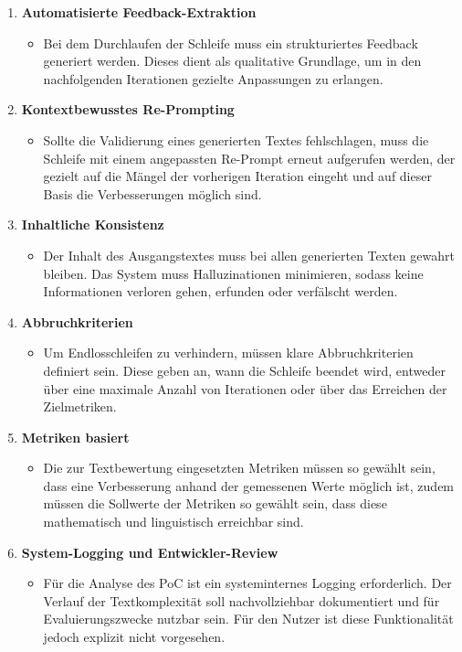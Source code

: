 \begin{enumerate}
	\item \textbf{Automatisierte Feedback-Extraktion}
	\begin{itemize}
		\item Bei dem Durchlaufen der Schleife muss ein strukturiertes Feedback generiert werden. Dieses dient als qualitative Grundlage, um in den nachfolgenden Iterationen gezielte Anpassungen zu erlangen.
	\end{itemize}
	\item \textbf{Kontextbewusstes Re-Prompting}
	\begin{itemize}
		\item Sollte die Validierung eines generierten Textes fehlschlagen, muss die Schleife mit einem angepassten Re-Prompt erneut aufgerufen werden, der gezielt auf die Mängel der vorherigen Iteration eingeht und auf dieser Basis die Verbesserungen möglich sind.
	\end{itemize}
	\item \textbf{Inhaltliche Konsistenz}
	\begin{itemize}
		\item Der Inhalt des Ausgangstextes muss bei allen generierten Texten gewahrt bleiben. Das System muss Halluzinationen minimieren, sodass keine Informationen verloren gehen, erfunden oder verfälscht werden.
	\end{itemize}
	\item \textbf{Abbruchkriterien}
	\begin{itemize}
		\item Um Endlosschleifen zu verhindern, müssen klare Abbruchkriterien definiert sein. Diese geben an, wann die Schleife beendet wird, entweder über eine maximale Anzahl von Iterationen oder über das Erreichen der Zielmetriken.
	\end{itemize}
	\item \textbf{Metriken basiert}
	\begin{itemize}
		\item Die zur Textbewertung eingesetzten Metriken müssen so gewählt sein, dass eine Verbesserung anhand der gemessenen Werte möglich ist, zudem müssen die Sollwerte der Metriken so gewählt sein, dass diese mathematisch und linguistisch erreichbar sind. 
	\end{itemize}
	\item \textbf{System-Logging und Entwickler-Review}
	\begin{itemize}
		\item Für die Analyse des PoC ist ein systeminternes Logging erforderlich. Der Verlauf der Textkomplexität soll nachvollziehbar dokumentiert und für Evaluierungszwecke nutzbar sein. Für den Nutzer ist diese Funktionalität jedoch explizit nicht vorgesehen.
	\end{itemize}
\end{enumerate}

